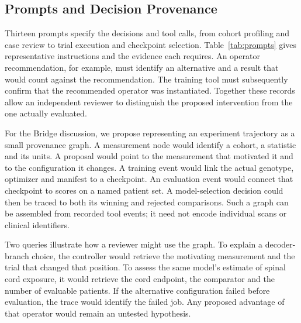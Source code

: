 \documentclass[letterpaper]{article}
\begin{document}
\subsection{Prompts and Decision Provenance}
Thirteen prompts specify the decisions and tool calls, from cohort profiling and case review to trial execution and checkpoint selection. Table~\ref{tab:prompts} gives representative instructions and the evidence each requires. An operator recommendation, for example, must identify an alternative and a result that would count against the recommendation. The training tool must subsequently confirm that the recommended operator was instantiated. Together these records allow an independent reviewer to distinguish the proposed intervention from the one actually evaluated.



For the Bridge discussion, we propose representing an experiment trajectory as a small provenance graph. A measurement node would identify a cohort, a statistic and its units. A proposal would point to the measurement that motivated it and to the configuration it changes. A training event would link the actual genotype, optimizer and manifest to a checkpoint. An evaluation event would connect that checkpoint to scores on a named patient set. A model-selection decision could then be traced to both its winning and rejected comparisons. Such a graph can be assembled from recorded tool events; it need not encode individual scans or clinical identifiers.

Two queries illustrate how a reviewer might use the graph. To explain a decoder-branch choice, the controller would retrieve the motivating measurement and the trial that changed that position. To assess the same model's estimate of spinal cord exposure, it would retrieve the cord endpoint, the comparator and the number of evaluable patients. If the alternative configuration failed before evaluation, the trace would identify the failed job. Any proposed advantage of that operator would remain an untested hypothesis.
\end{document}
